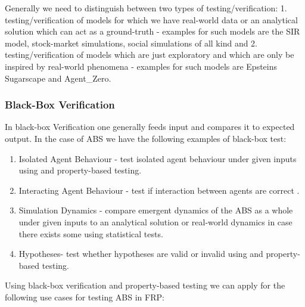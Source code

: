 Generally we need to distinguish between two types of testing/verification: 1. testing/verification of models for which we have real-world data or an analytical solution which can act as a ground-truth - examples for such models are the SIR model, stock-market simulations, social simulations of all kind and 2. testing/verification of models which are just exploratory and which are only be inspired by real-world phenomena - examples for such models are Epsteins Sugarscape and Agent\_Zero.

\subsubsection{Black-Box Verification}
In black-box Verification one generally feeds input and compares it to expected output. In the case of ABS we have the following examples of black-box test:
\begin{enumerate}
	\item Isolated Agent Behaviour - test isolated agent behaviour under given inputs using and property-based testing.
	\item Interacting Agent Behaviour - test if interaction between agents are correct .
	\item Simulation Dynamics - compare emergent dynamics of the ABS as a whole under given inputs to an analytical solution or real-world dynamics in case there exists some using statistical tests.
	\item Hypotheses- test whether hypotheses are valid or invalid using and property-based testing. %
\end{enumerate}


Using black-box verification and property-based testing we can apply for the following use cases for testing ABS in FRP:

